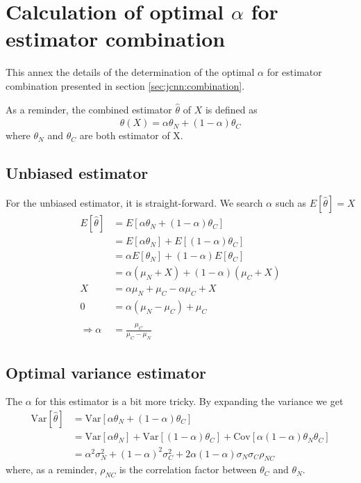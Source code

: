 \documentclass[../main.tex]{subfiles}
\begin{document}
\chapter{Calculation of optimal $\alpha$ for estimator combination}
\label{sec:annex:jcnn:alpha}

This annex the details of the determination of the optimal $\alpha$ for estimator combination presented in section \ref{sec:jcnn:combination}.

As a reminder, the combined estimator $\hat{\theta}$ of $X$ is defined as
\begin{equation}
  \hat{\theta}(X) = \alpha \theta_N + (1 - \alpha) \theta_C
\end{equation}
where $\theta_N$ and $\theta_C$ are both estimator of X.

\section{Unbiased estimator}
\label{sec:annex:jcnn:unbiased}
For the unbiased estimator, it is straight-forward. We search $\alpha$ such as $E[\hat{\theta}] = X$
\begin{align}
  E[\hat{\theta}] &= E[\alpha \theta_N + (1-\alpha) \theta_C] \\
                  &= E[\alpha \theta_N] + E[(1-\alpha) \theta_C] \\
                  &= \alpha E[\theta_N] + (1-\alpha) E[\theta_C] \\
                  &= \alpha (\mu_N + X) + (1-\alpha) (\mu_C + X) \\
                X &= \alpha \mu_N + \mu_C - \alpha \mu_C + X \\
                0 &= \alpha (\mu_N - \mu_C) + \mu_C \\
                \\
                \Rightarrow \alpha &= \frac{\mu_C}{\mu_C - \mu_N}
\end{align}

\section{Optimal variance estimator}
\label{sec:annex:jcnn:variance}

The $\alpha$ for this estimator is a bit more tricky. By expanding the variance we get
\begin{align}
  \mathrm{Var}[\hat{\theta}] &= \mathrm{Var}[\alpha \theta_N + (1-\alpha) \theta_C] \\
                             &= \mathrm{Var}[\alpha \theta_N] + \mathrm{Var}[(1-\alpha) \theta_C] + \mathrm{Cov}[\alpha(1-\alpha) \theta_N \theta_C] \\
                             &= \alpha^2 \sigma_N^2 + (1 - \alpha)^2 \sigma_C^2 + 2\alpha(1-\alpha) \sigma_N \sigma_C \rho_{NC}
\end{align}
where, as a reminder, $\rho_{NC}$ is the correlation factor between $\theta_C$ and $\theta_N$.
\end{document}
